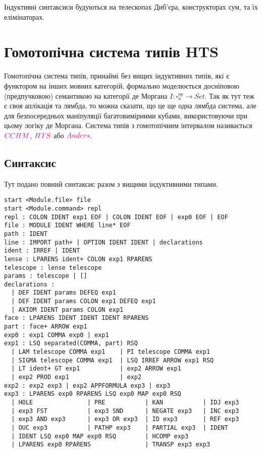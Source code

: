 Індуктивні синтаксиси будуються на телескопах Диб'єра,
конструкторах сум, та їх елімінаторах.


\newpage
\section{Гомотопічна система типів HTS}
Гомотопічна система типів, принаймі без вищих індуктивних типів, які є функтором на інших мовних категорій,
формально моделюється досніповою (предпучковою) семантикою на категорії де Моргана $I: \square_n^{op} \rightarrow Set$.
Так як тут теж є своя аплікація та лямбда, то можна сказати, що це ще
одна лямбда система, але для безпосередньох маніпуляції багатовимірними кубами,
використовуючи при цьому логіку де Моргана.
Система типів з гомотопічним інтервалом називається $\textcolor{magenta}{CCHM}$,
$\textcolor{magenta}{HTS}$ або $\textcolor{magenta}{Anders}$.

\subsection*{Синтаксис}
Тут подано повний синтаксис разом з вищими індуктивними типами.

\begin{lstlisting}
start <Module.file> file
start <Module.command> repl
repl : COLON IDENT exp1 EOF | COLON IDENT EOF | exp0 EOF | EOF
file : MODULE IDENT WHERE line* EOF
path : IDENT
line : IMPORT path+ | OPTION IDENT IDENT | declarations
ident : IRREF | IDENT
lense : LPARENS ident+ COLON exp1 RPARENS
telescope : lense telescope
params : telescope | []
declarations :
  | DEF IDENT params DEFEQ exp1
  | DEF IDENT params COLON exp1 DEFEQ exp1
  | AXIOM IDENT params COLON exp1
face : LPARENS IDENT IDENT IDENT RPARENS
part : face+ ARROW exp1
exp0 : exp1 COMMA exp0 | exp1
exp1 : LSQ separated(COMMA, part) RSQ
  | LAM telescope COMMA exp1    | PI telescope COMMA exp1
  | SIGMA telescope COMMA exp1  | LSQ IRREF ARROW exp1 RSQ
  | LT ident+ GT exp1           | exp2 ARROW exp1
  | exp2 PROD exp1              | exp2
exp2 : exp2 exp3 | exp2 APPFORMULA exp3 | exp3
exp3 : LPARENS exp0 RPARENS LSQ exp0 MAP exp0 RSQ
  | HOLE               | PRE           | KAN           | IDJ exp3
  | exp3 FST           | exp3 SND      | NEGATE exp3   | INC exp3
  | exp3 AND exp3      | exp3 OR exp3  | ID exp3       | REF exp3
  | OUC exp3           | PATHP exp3    | PARTIAL exp3  | IDENT
  | IDENT LSQ exp0 MAP exp0 RSQ        | HCOMP exp3
  | LPARENS exp0 RPARENS               | TRANSP exp3 exp3
\end{lstlisting}


